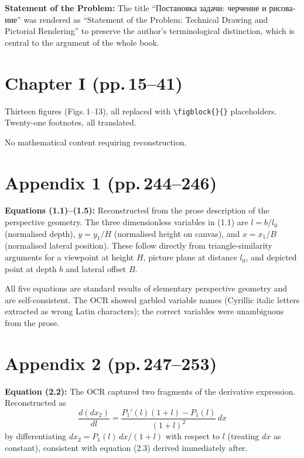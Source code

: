 \documentclass[12pt]{article}
\begin{document}
\textbf{Statement of the Problem:} The title ``\foreignlanguage{russian}{Постановка задачи: черчение и
рисование}'' was rendered as ``Statement of the Problem: Technical Drawing and
Pictorial Rendering'' to preserve the author's terminological distinction, which
is central to the argument of the whole book.

\section*{Chapter I (pp.\,15--41)}

Thirteen figures (Figs.\,1--13), all replaced with \verb|\figblock{}{}|
placeholders. Twenty-one footnotes, all translated.

No mathematical content requiring reconstruction.

\section*{Appendix 1 (pp.\,244--246)}

\textbf{Equations (1.1)--(1.5):} Reconstructed from the prose description
of the perspective geometry. The three dimensionless variables in (1.1) are
$l = b/l_0$ (normalised depth), $y = y_1/H$ (normalised height on canvas),
and $x = x_1/B$ (normalised lateral position). These follow directly from
triangle-similarity arguments for a viewpoint at height $H$, picture plane at
distance $l_0$, and depicted point at depth $b$ and lateral offset $B$.

All five equations are standard results of elementary perspective geometry and
are self-consistent. The OCR showed garbled variable names (Cyrillic italic
letters extracted as wrong Latin characters); the correct variables were
unambiguous from the prose.

\section*{Appendix 2 (pp.\,247--253)}

\textbf{Equation (2.2):} The OCR captured two fragments of the derivative
expression. Reconstructed as
\[
  \frac{d(dx_2)}{dl} = \frac{P_1'(l)(1+l) - P_1(l)}{(1+l)^2}\,dx
\]
by differentiating $dx_2 = P_1(l)\,dx/(1+l)$ with respect to $l$ (treating
$dx$ as constant), consistent with equation (2.3) derived immediately after.
\end{document}
